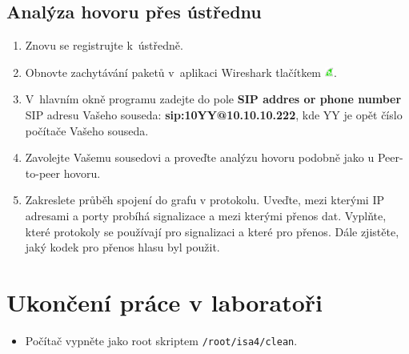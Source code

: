 \subsection{Analýza hovoru přes ústřednu}
\begin{enumerate}
    \item Znovu se registrujte k ústředně.
    \item Obnovte zachytávání paketů v aplikaci Wireshark tlačítkem  \includegraphics[width=3mm]{img/ws_start.png}.
    \item V hlavním okně programu zadejte do pole {\bf SIP addres or phone number} SIP adresu Vašeho souseda: {\bf sip:10YY@10.10.10.222}, kde YY je opět číslo počítače Vašeho souseda.
    \item Zavolejte Vašemu sousedovi a proveďte analýzu hovoru podobně jako u Peer-to-peer hovoru.
    \item Zakreslete průběh spojení do grafu v protokolu. Uveďte, mezi kterými IP adresami a porty probíhá signalizace a mezi kterými přenos dat. Vyplňte, které protokoly se používají pro signalizaci a které pro přenos. Dále zjistěte, jaký kodek pro přenos hlasu byl použit.
\end{enumerate}

\section{Ukončení práce v laboratoři}
\begin{itemize}
  \item Počítač vypněte jako root skriptem {\tt /root/isa4/clean}.
\end{itemize}
